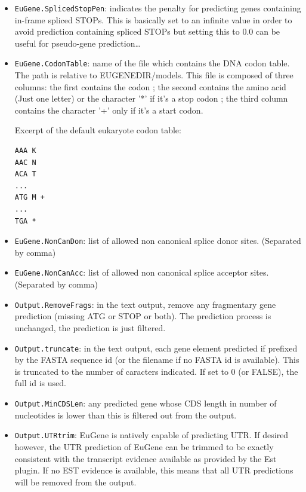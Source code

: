 \documentclass[a4paper,titlepage]{report}
\begin{document}
\begin{itemize}
\item \texttt{EuGene.SplicedStopPen}: indicates the penalty for
  predicting genes containing in-frame spliced STOPs. This is
  basically set to an infinite value in order to avoid prediction
  containing spliced STOPs but setting this to 0.0 can be useful for
  pseudo-gene prediction\ldots
  
\item \texttt{EuGene.CodonTable}: name of the file which contains 
the DNA codon table. The path is relative to EUGENEDIR/models. 
This file is composed of three columns:
the first contains the codon ; the second contains the amino acid (Just one letter) or the character '*' if it's a stop codon ;
the third column contains the character '+' only if it's a start codon.

Excerpt of the default eukaryote codon table:
\begin{Verbatim}
AAA K	
AAC N
ACA T
...
ATG M +
...
TGA *
\end{Verbatim}

\item \texttt{EuGene.NonCanDon}: list of allowed non canonical splice donor sites. (Separated by comma)

\item \texttt{EuGene.NonCanAcc}: list of allowed non canonical splice acceptor sites. (Separated by comma)

\item \texttt{Output.RemoveFrags}: in the text output, remove any 
fragmentary gene prediction (missing ATG or STOP or both). The prediction
process is unchanged,  the prediction is just filtered. 

\item \texttt{Output.truncate}: in the text output, each gene element
  predicted if prefixed by the FASTA sequence id (or the filename if
  no FASTA id is available). This is truncated to the number of
  caracters indicated. If set to 0 (or FALSE), the full id is used.

\item \texttt{Output.MinCDSLen}: any predicted gene whose CDS length
  in number of nucleotides is lower than this is filtered out from the
  output.

\item \texttt{Output.UTRtrim}: EuGene is natively capable of
  predicting UTR. If desired however, the UTR prediction of EuGene can
  be trimmed to be exactly consistent with the transcript evidence
  available as provided by the Est plugin. If no EST evidence is
  available, this means that all UTR predictions will be removed from
  the output.


\end{itemize}
\end{document}
